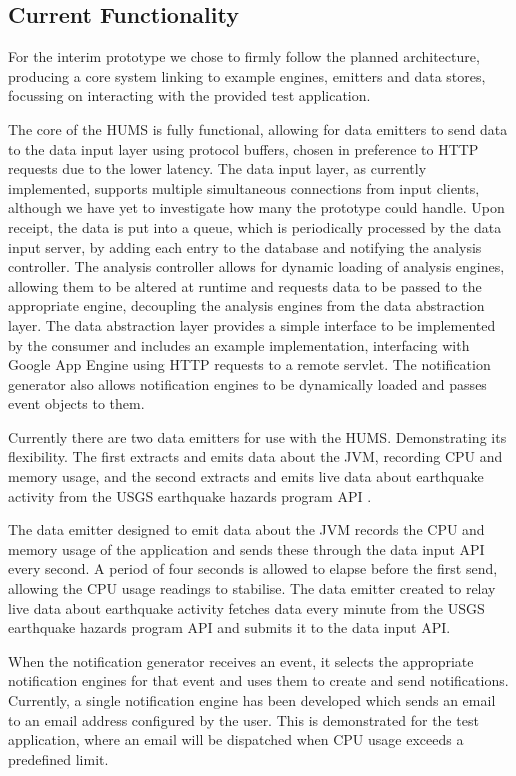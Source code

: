 \documentclass[10pt,a4paper]{article}
\begin{document}
\subsection{Current Functionality}
For the interim prototype we chose to firmly follow the planned architecture, producing a core system linking to example engines, emitters and data stores, focussing on interacting with the provided test application.

The core of the HUMS is fully functional, allowing for data emitters to send data 
to the data input layer using protocol buffers, chosen in preference to HTTP 
requests due to the lower latency. The data input layer, as currently 
implemented, supports multiple simultaneous connections from input clients, 
although we have yet to investigate how many the prototype could handle. 
Upon receipt, the data is put into a queue, which is periodically processed by 
the data input server, by adding each entry to the database and notifying the 
analysis controller. The analysis controller allows for dynamic loading of 
analysis engines, allowing them to be altered at runtime and requests data to 
be passed to the appropriate engine, decoupling the analysis engines from the 
data abstraction layer. The data abstraction layer provides a simple interface to 
be implemented by the consumer and includes an example implementation, 
interfacing with Google App Engine using HTTP requests to a remote servlet. 
The notification generator also allows notification engines to be dynamically 
loaded and passes event objects to them.

Currently there are two data emitters for use with the HUMS. Demonstrating its 
flexibility. The first extracts and emits data about the JVM, recording CPU and 
memory usage, and the second extracts and emits live data about earthquake 
activity from the USGS earthquake hazards program API \cite{usgs}.

The data emitter designed to emit data about the JVM records the CPU and 
memory usage of the application and sends these through the data input API 
every second. A period of four seconds is allowed to elapse before the first 
send, allowing the CPU usage readings to stabilise. The data emitter created to 
relay live data about earthquake activity fetches data every minute from the 
USGS earthquake hazards program API and submits it to the data input API.


When the notification generator receives an event, it selects the appropriate 
notification engines for that event and uses them to create and send  
notifications. Currently, a single notification engine has been developed which 
sends an email to an email address configured by the user. This is 
demonstrated for the test application, where an email will be dispatched when 
CPU usage exceeds a predefined limit.
\end{document}
